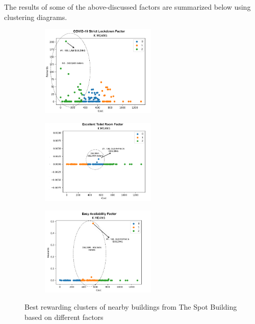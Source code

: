 \begin{itemize}
The results of some of the above-discussed factors are summarized below using clustering diagrams.

\begin{figure}[H]
\centering
\begin{subfigure}[b]{0.30\textwidth}
  \centering
  \includegraphics[width=5.5cm,keepaspectratio=true]{resources/images/spatial-tr/110_covidplot.png}
\end{subfigure}
\begin{subfigure}[b]{0.30\textwidth}
  \centering
  \includegraphics[width=5.5cm,keepaspectratio=true]{resources/images/spatial-tr/110_roomplot.png}
\end{subfigure}
\begin{subfigure}[b]{0.30\textwidth}
  \centering
  \includegraphics[width=5.5cm,keepaspectratio=true]{resources/images/spatial-tr/110_easyplot.png}
\end{subfigure}
\caption{Best rewarding clusters of nearby buildings from The Spot Building based on different factors}
\label{fig:spot_factors}
\end{figure}
\end{itemize}

